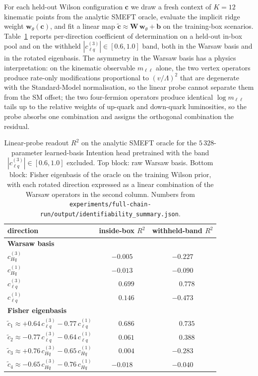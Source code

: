 \documentclass[11pt,a4paper]{article}
\newcommand{\Lam}{\Lambda}
\newcommand{\mll}{m_{\ell\ell}}
\begin{document}
For each held-out Wilson configuration $\bm{c}$ we draw a fresh context of $K = 12$ kinematic points from the analytic SMEFT oracle, evaluate the implicit ridge weight $\bm{w}_\theta(\bm{c})$, and fit a linear map $\tilde{\bm{c}} \approx \bm{W}\,\bm{w}_\theta + \bm{b}$ on the training-box scenarios. Table~\ref{tab:disclosure} reports per-direction coefficient of determination on a held-out in-box pool and on the withheld $|c_{\ell q}^{(3)}| \in [0.6, 1.0]$ band, both in the Warsaw basis and in the rotated eigenbasis. The asymmetry in the Warsaw basis has a physics interpretation: on the kinematic observable $\mll$ alone, the two vertex operators produce rate-only modifications proportional to $(v/\Lam)^2$ that are degenerate with the Standard-Model normalisation, so the linear probe cannot separate them from the SM offset; the two four-fermion operators produce identical $\log\mll$ tails up to the relative weights of up-quark and down-quark luminosities, so the probe absorbs one combination and assigns the orthogonal combination the residual.

\begin{table}[t]
\centering\small
\caption{\label{tab:disclosure} Linear-probe readout $R^2$ on the analytic SMEFT oracle for the $5\,328$-parameter learned-basis Intention head pretrained with the band $|c_{\ell q}^{(3)}| \in [0.6, 1.0]$ excluded. Top block: raw Warsaw basis. Bottom block: Fisher eigenbasis of the oracle on the training Wilson prior, with each rotated direction expressed as a linear combination of the Warsaw operators in the second column. Numbers from \texttt{experiments/full-chain-run/output/identifiability\_summary.json}.}
\begin{tabular}{lcc}
\toprule
direction & inside-box $R^2$ & withheld-band $R^2$ \\
\midrule
\multicolumn{3}{l}{\textbf{Warsaw basis}} \\
$c_{Hq}^{(3)}$  & $-0.005$  & $-0.227$ \\
$c_{Hq}^{(1)}$  & $-0.013$  & $-0.090$ \\
$c_{\ell q}^{(3)}$ & $\phantom{-}0.699$  & $\phantom{-}0.778$ \\
$c_{\ell q}^{(1)}$ & $\phantom{-}0.146$  & $-0.473$ \\
\midrule
\multicolumn{3}{l}{\textbf{Fisher eigenbasis}} \\
$\tilde{c}_1 \approx +0.64\,c_{\ell q}^{(3)} - 0.77\,c_{\ell q}^{(1)}$ & $\phantom{-}0.686$ & $\phantom{-}0.735$ \\
$\tilde{c}_2 \approx -0.77\,c_{\ell q}^{(3)} - 0.64\,c_{\ell q}^{(1)}$ & $\phantom{-}0.061$ & $\phantom{-}0.388$ \\
$\tilde{c}_3 \approx +0.76\,c_{Hq}^{(3)} - 0.65\,c_{Hq}^{(1)}$ & $\phantom{-}0.004$ & $-0.283$ \\
$\tilde{c}_4 \approx -0.65\,c_{Hq}^{(3)} - 0.76\,c_{Hq}^{(1)}$ & $-0.018$ & $-0.040$ \\
\bottomrule
\end{tabular}
\end{table}
\end{document}
